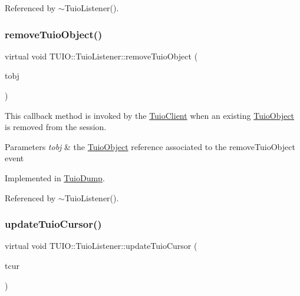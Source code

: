 Referenced by $\sim$\+Tuio\+Listener().

\mbox{\label{class_t_u_i_o_1_1_tuio_listener_acf6d81485aaad7747cb399c325b831ee}} 
\subsubsection{\texorpdfstring{remove\+Tuio\+Object()}{removeTuioObject()}}
{\footnotesize\ttfamily virtual void T\+U\+I\+O\+::\+Tuio\+Listener\+::remove\+Tuio\+Object (\begin{DoxyParamCaption}\item[{\hyperlink{class_t_u_i_o_1_1_tuio_object}{Tuio\+Object} $\ast$}]{tobj }\end{DoxyParamCaption})\hspace{0.3cm}{\ttfamily [pure virtual]}}

This callback method is invoked by the \hyperlink{class_t_u_i_o_1_1_tuio_client}{Tuio\+Client} when an existing \hyperlink{class_t_u_i_o_1_1_tuio_object}{Tuio\+Object} is removed from the session.


\begin{DoxyParams}{Parameters}
{\em tobj} & the \hyperlink{class_t_u_i_o_1_1_tuio_object}{Tuio\+Object} reference associated to the remove\+Tuio\+Object event \\
\hline
\end{DoxyParams}


Implemented in \hyperlink{class_tuio_dump_a5ed9e2ea7858b885bf52558c1c6e7e69}{Tuio\+Dump}.



Referenced by $\sim$\+Tuio\+Listener().

\mbox{\label{class_t_u_i_o_1_1_tuio_listener_a1d60e2d80b0e09d74ded8713362c43c4}} 
\subsubsection{\texorpdfstring{update\+Tuio\+Cursor()}{updateTuioCursor()}}
{\footnotesize\ttfamily virtual void T\+U\+I\+O\+::\+Tuio\+Listener\+::update\+Tuio\+Cursor (\begin{DoxyParamCaption}\item[{\hyperlink{class_t_u_i_o_1_1_tuio_cursor}{Tuio\+Cursor} $\ast$}]{tcur }\end{DoxyParamCaption})\hspace{0.3cm}{\ttfamily [pure virtual]}}

